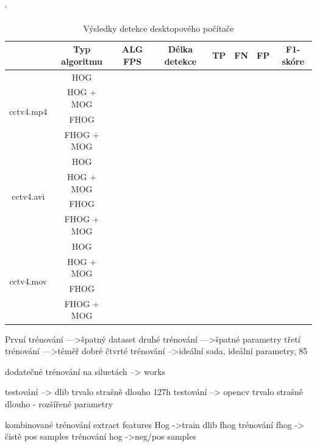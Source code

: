 \begin{table}[H]
\catcode`
\centering
\caption{Výsledky detekce desktopového počítače}
\label{resultTabDesktop}
\begin{tabular}{|c|c|c|c|c|c|c|c|}
\hline
                         & Typ algoritmu   & ALG FPS & Délka detekce & TP & FN & FP & F1-skóre \\ \hline
\multirow{4}{*}{cctv4.mp4} & HOG        &         &               &    &    &    &          \\ \cline{2-8} 
                         & HOG + MOG  &         &               &    &    &    &          \\ \cline{2-8} 
                         & FHOG       &         &               &    &    &    &          \\ \cline{2-8} 
                         & FHOG + MOG &         &               &    &    &    &          \\ \hline\hline 
\multirow{4}{*}{cctv4.avi} & HOG        &         &               &    &    &    &          \\ \cline{2-8} 
                         & HOG + MOG  &         &               &    &    &    &          \\ \cline{2-8} 
                         & FHOG       &         &               &    &    &    &          \\ \cline{2-8} 
                         & FHOG + MOG &         &               &    &    &    &          \\ \hline \hline
\multirow{4}{*}{cctv4.mov} & HOG        &         &               &    &    &    &          \\ \cline{2-8} 
                         & HOG + MOG  &         &               &    &    &    &          \\ \cline{2-8} 
                         & FHOG       &         &               &    &    &    &          \\ \cline{2-8} 
                         & FHOG + MOG &         &               &    &    &    &          \\ \hline
\end{tabular}
\end{table}
 První trénování --->špatný dataset
 druhé trénování --->špatné parametry
 třetí trénování --->téměř dobré
 čtvrté trénování -->ideální sada, ideální parametry, 85%
 
 dodatečné trénování na siluetách --> works


 testování --> dlib trvalo strašně dlouho 127h
 testování --> opencv trvalo strašně dlouho - rozšířené parametry


 kombinované trénování  extract features Hog  ->train dlib fhog
 trénování fhog -> čistě pos samples
 trénování hog ->neg/pos samples

